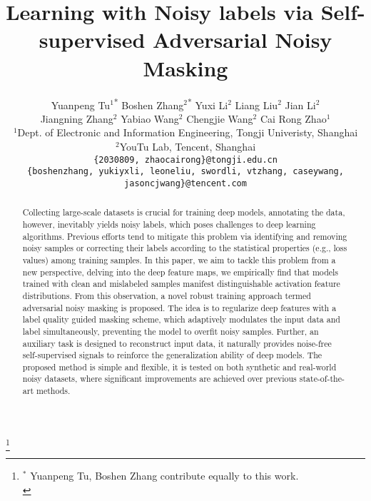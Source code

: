 \documentclass[10pt,twocolumn,letterpaper]{article}
\begin{document}
\title{Learning with Noisy labels via Self-supervised Adversarial Noisy Masking}

\author{Yuanpeng Tu$^{1}$\textsuperscript{*} \quad Boshen Zhang$^{2}$\textsuperscript{*} \quad Yuxi Li$^{2}$ \quad Liang Liu$^{2}$ \quad Jian Li$^{2}$ \\ Jiangning Zhang$^{2}$ \quad Yabiao Wang$^{2}$ \quad  Chengjie Wang$^{2}$ \quad Cai Rong Zhao$^{1}$\\
	$^{1}$Dept. of Electronic and Information Engineering, Tongji Univeristy, Shanghai \\ $^{2}$YouTu Lab, Tencent, Shanghai \\
{\tt\small \{2030809, zhaocairong\}@tongji.edu.cn}\\
	{\tt\small \{boshenzhang, yukiyxli, leoneliu, swordli, vtzhang, caseywang, jasoncjwang\}@tencent.com}}


\maketitle

\footnote{$^{*}$ Yuanpeng Tu, Boshen Zhang contribute equally to this work.\\}

\begin{abstract}
   Collecting large-scale datasets is crucial for training deep models, annotating the data,  however, inevitably yields noisy labels, which poses challenges to deep learning algorithms. Previous efforts tend to mitigate this problem via identifying and removing noisy samples or correcting their labels according to the statistical properties (e.g., loss values) among training samples. In this paper, we aim to tackle this problem from a new perspective, delving into the deep feature maps, we empirically find that models trained with clean and mislabeled samples manifest distinguishable activation feature distributions. From this observation, a novel robust training approach termed adversarial noisy masking is proposed. The idea is to regularize deep features with a label quality guided masking scheme, which adaptively modulates the input data and label simultaneously, preventing the model to overfit noisy samples. Further, an auxiliary task is designed to reconstruct input data, it naturally provides noise-free self-supervised signals to reinforce the generalization ability of deep models. The proposed method is simple and flexible, it is tested on both synthetic and real-world noisy datasets, where significant improvements are achieved over previous state-of-the-art methods. 
\end{abstract}
\end{document}
